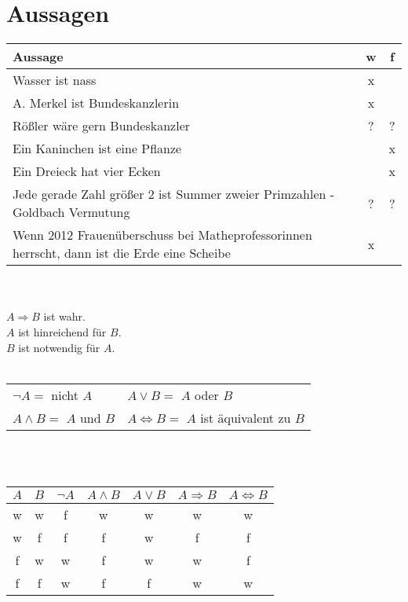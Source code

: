 \section{Aussagen}
\begin{center}
\begin{tabular}{l|c|c}
Aussage & w & f\\ \hline
Wasser ist nass & x & \\
A. Merkel ist Bundeskanzlerin & x & \\
Rößler wäre gern Bundeskanzler & ? & ?\\
Ein Kaninchen ist eine Pflanze & & x\\
Ein Dreieck hat vier Ecken & & x\\
Jede gerade Zahl größer 2 ist Summer zweier Primzahlen - Goldbach Vermutung & ? & ? \\
Wenn 2012 Frauenüberschuss bei Matheprofessorinnen herrscht, dann ist die Erde eine Scheibe & x &\\
\end{tabular}

\quad\\
\quad\\

$ A \Rightarrow B$ ist wahr. \\
$A$ ist hinreichend für $B$. \\
$B$ ist notwendig für $A$. \\

\quad\\

\begin{tabular}{ll}
	$\neg A=$ nicht $A$ & $A \vee B =$ $A$ oder $B$\\
	$A \wedge B =$ $A$ und $B$ & $A \Leftrightarrow B =$ $A$ ist äquivalent zu $B$\\
\end{tabular}

\quad\\
\quad\\

\begin{tabular}{cc||ccccc}
$A$ & $B$ & $\neg A$ & $A \wedge B$ & $A \vee B$ & $A \Rightarrow B$ & $A \Leftrightarrow B$\\ \hline
w & w & f & w & w & w & w \\
w & f & f & f &w & f & f \\
f & w & w & f & w & w & f \\
f & f & w & f & f & w & w\\
\end{tabular}
\end{center}
%
%
%
